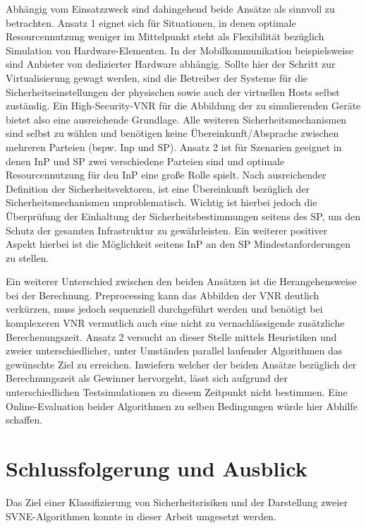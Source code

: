 \documentclass{lni}
\begin{document}
Abhängig vom Einsatzzweck sind dahingehend beide Ansätze als sinnvoll zu betrachten. Ansatz 1 eignet sich für Situationen, in denen optimale Resourcennutzung weniger im Mittelpunkt steht als Flexibilität bezüglich Simulation von Hardware-Elementen. In der Mobilkommunikation beispielsweise sind Anbieter von dedizierter Hardware abhängig. Sollte hier der Schritt zur Virtualisierung gewagt werden, sind die Betreiber der Systeme für die Sicherheitseinstellungen der physischen sowie auch der virtuellen Hosts selbst zuständig. Ein High-Security-VNR für die Abbildung der zu simulierenden Geräte bietet also eine ausreichende Grundlage. Alle weiteren Sicherheitsmechanismen sind selbst zu wählen und benötigen keine Übereinkunft/Absprache zwischen mehreren Parteien (bspw. Inp und SP). Ansatz 2 ist für Szenarien geeignet in denen InP und SP zwei verschiedene Parteien sind und optimale Resourcennutzung für den InP eine große Rolle spielt. Nach ausreichender Definition der Sicherheitsvektoren, ist eine Übereinkunft bezüglich der Sicherheitsmechanismen unproblematisch. Wichtig ist hierbei jedoch die Überprüfung der Einhaltung der Sicherheitsbestimmungen seitens des SP, um den Schutz der gesamten Infrastruktur zu gewährleisten. Ein weiterer positiver Aspekt hierbei ist die Möglichkeit seitens InP an den SP Mindestanforderungen zu stellen.

Ein weiterer Unterschied zwischen den beiden Ansätzen ist die Herangehensweise bei der Berechnung. Preprocessing kann das Abbilden der VNR deutlich verkürzen, muss jedoch sequenziell durchgeführt werden und benötigt bei komplexeren VNR vermutlich auch eine nicht zu vernachlässigende zusätzliche Berechenungszeit. Ansatz 2 versucht an dieser Stelle mittels Heuristiken und zweier unterschiedlicher, unter Umständen parallel laufender Algorithmen das gewünschte Ziel zu erreichen. Inwiefern welcher der beiden Ansätze bezüglich der Berechnungszeit als Gewinner hervorgeht, lässt sich aufgrund der unterschiedlichen Testsimulationen zu diesem Zeitpunkt nicht bestimmen. Eine Online-Evaluation beider Algorithmen zu selben Bedingungen würde hier Abhilfe schaffen.


\section{Schlussfolgerung und Ausblick}
\label{sec:schluss}

Das Ziel einer Klassifizierung von Sicherheitsrisiken und der Darstellung zweier SVNE-Algorithmen konnte in dieser Arbeit umgesetzt werden.
\end{document}
